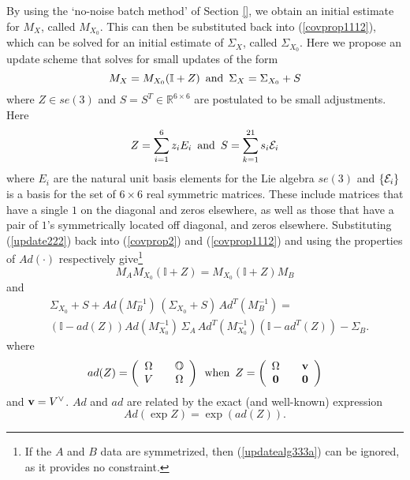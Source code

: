 \documentclass[twocolumn,10pt]{asme2ej}
\begin{document}
By using the `no-noise batch method' of Section \ref{}, we obtain an initial estimate for $M_X$, called $M_{X_0}$. This can then be substituted back into
(\ref{covprop1112}), which can be solved for an initial estimate of $\Sigma_X$, called $\Sigma_{X_0}$. Here we propose an update scheme that solves for small
updates of the form
\begin{equation}
M_X = M_{X_0} (\mathbb{I} + Z) \,\,\, {\rm and} \,\,\, \Sigma_X = \Sigma_{X_0} + S 
\label{update222}
\end{equation}
where $Z \in se(3)$ and $S=S^T \in \mathbb{R}^{6\times 6}$ are postulated to be small adjustments.
Here 
\begin{equation}
Z = \sum_{i=1}^{6} z_i E_i \,\,\, {\rm and} \,\,\, 
S = \sum_{k=1}^{21} s_i {\cal E}_i
\label{szbasis}
\end{equation}
where $E_i$ are the natural unit basis elements for the Lie algebra $se(3)$ and
$\{{\cal E}_i\}$ is a basis for the set of $6\times 6$ real symmetric matrices. 
These include matrices that have a single $1$ on the diagonal and zeros elsewhere, as well as those that have a pair of $1$'s
symmetrically located off diagonal, and zeros elsewhere. Substituting (\ref{update222}) back into (\ref{covprop2}) and (\ref{covprop1112}) and using
the properties of $Ad(\cdot)$ respectively give\footnote{If the $A$ and $B$ data are symmetrized, then (\ref{updatealg333a}) can be ignored, as it provides
no constraint.}
\begin{equation}
M_A M_{X_0} (\mathbb{I} + Z) = M_{X_0} (\mathbb{I} + Z) M_B
\label{updatealg333a}
\end{equation}
and 
\begin{equation}
\begin{split}
&\Sigma_{X_0} + S + Ad(M_B^{-1}) \, (\Sigma_{X_0} + S) \, Ad^T(M_B^{-1}) =\\
& (\mathbb{I} - ad(Z)) Ad(M_{X_0}^{-1}) \, \Sigma_A \, Ad^T(M_{X_0}^{-1}) (\mathbb{I} - ad^T(Z)) - \Sigma_{B}.
\end{split}
\label{updatealg333} 
\end{equation}
where
$$ ad(Z) = \left(\begin{array}{ccc}
\Omega && \mathbb{O} \\
V && \Omega \end{array} \right)
\,\,\, {\rm when} \,\,\,
Z = \left(\begin{array}{ccc}
\Omega && {\bf v} \\
{\bf 0} && {\bf 0} \end{array} \right) $$
and ${\bf v} = V^{\vee}$. $Ad$ and $ad$ are related by the exact (and well-known) expression 
$$ Ad(\exp Z) = \exp(ad(Z)). $$
\end{document}
